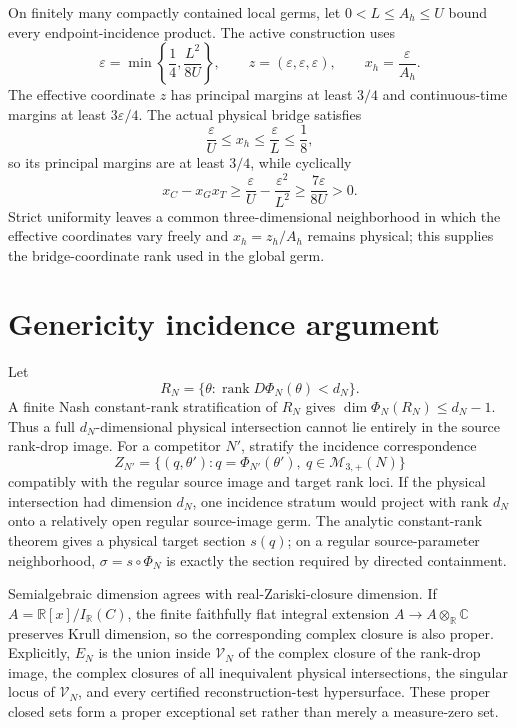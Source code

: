 \documentclass[10pt]{article}
\newcommand{\rank}{\operatorname{rank}}
\begin{document}
On finitely many compactly contained local germs, let
\(0<L\le A_h\le U\) bound every endpoint-incidence product.  The active
construction uses
\[
\varepsilon=\min\left\{\frac14,\frac{L^2}{8U}\right\},\qquad
z=(\varepsilon,\varepsilon,\varepsilon),\qquad
x_h=\frac{\varepsilon}{A_h}.
\]
The effective coordinate \(z\) has principal margins at least \(3/4\) and
continuous-time margins at least \(3\varepsilon/4\).  The actual physical
bridge satisfies
\[
\frac{\varepsilon}{U}\le x_h\le\frac{\varepsilon}{L}\le\frac18,
\]
so its principal margins are at least \(3/4\), while cyclically
\[
x_C-x_Gx_T\ge
\frac{\varepsilon}{U}-\frac{\varepsilon^2}{L^2}
\ge\frac{7\varepsilon}{8U}>0.
\]
Strict uniformity leaves a common three-dimensional neighborhood in which
the effective coordinates vary freely and \(x_h=z_h/A_h\) remains physical;
this supplies the bridge-coordinate rank used in the global germ.

\section{Genericity incidence argument}

Let
\[
R_N=\{\theta:\rank D\Phi_N(\theta)<d_N\}.
\]
A finite Nash constant-rank stratification of \(R_N\) gives
\(\dim\Phi_N(R_N)\le d_N-1\).  Thus a full \(d_N\)-dimensional physical
intersection cannot lie entirely in the source rank-drop image.  For a
competitor \(N'\), stratify the incidence correspondence
\[
Z_{N'}=\{(q,\theta'):q=\Phi_{N'}(\theta'),\ q\in\mathcal M_{3,+}(N)\}
\]
compatibly with the regular source image and target rank loci.  If the
physical intersection had dimension \(d_N\), one incidence stratum would
project with rank \(d_N\) onto a relatively open regular source-image germ.
The analytic constant-rank theorem gives a physical target section \(s(q)\);
on a regular source-parameter neighborhood,
\(\sigma=s\circ\Phi_N\) is exactly the section required by directed
containment.

Semialgebraic dimension agrees with real-Zariski-closure dimension.  If
\(A=\mathbb R[x]/I_{\mathbb R}(C)\), the finite faithfully flat integral
extension \(A\to A\otimes_{\mathbb R}\mathbb C\) preserves Krull dimension,
so the corresponding complex closure is also proper.  Explicitly, \(E_N\) is
the union inside \(\mathcal V_N\) of the complex closure of the rank-drop
image, the complex closures of all inequivalent physical intersections, the
singular locus of \(\mathcal V_N\), and every certified reconstruction-test
hypersurface.  These proper closed sets form a proper exceptional set rather
than merely a measure-zero set.
\end{document}

